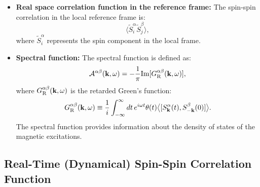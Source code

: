\begin{itemize}
    \item \textbf{Real space correlation function in the reference frame:}
    The spin-spin correlation in the local reference frame is:
    \begin{equation}
        \langle \widetilde{S}^{\alpha}_{i} \widetilde{S}_{j}^{\beta} \rangle,
    \end{equation}
    where $\widetilde{S}^{\alpha}_{i}$ represents the spin component in the local frame.
    
    \item \textbf{Spectral function:}
    The spectral function is defined as:
    \begin{equation}
        \mathcal{A}^{\alpha\beta}(\mathbf{k}, \omega) = -\frac{1}{\pi} \mathrm{Im}[G^{\alpha\beta}_{\rm R}(\mathbf{k}, \omega)],
    \end{equation}
    where $G^{\alpha\beta}_{\rm R}(\mathbf{k}, \omega)$ is the retarded Green's function:
    \begin{equation}
        G^{\alpha\beta}_{\rm R}(\mathbf{k}, \omega) 
        \equiv \frac{1}{i} \int_{-\infty}^{\infty} dt \, e^{i \omega t} \theta(t) \big\langle [S_{\mathbf{k}}^{\alpha}(t), S_{-\mathbf{k}}^{\beta}(0)] \big\rangle.
    \end{equation}
    The spectral function provides information about the density of states of the magnetic excitations.
\end{itemize}




\subsection{Real-Time (Dynamical) Spin-Spin Correlation Function}\label{subsec: Real-Time (Dynamical) Spin-Spin Correlation Function}

